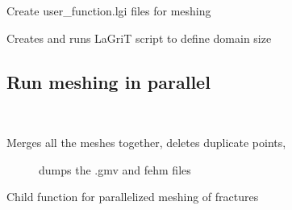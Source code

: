 \documentclass[letterpaper,10pt,english]{sphinxmanual}
\begin{document}

\begin{fulllineitems}
\label{pydfnworks:pydfnworks.lagrit_scripts.create_user_functions}
Create user\_function.lgi files for meshing

\end{fulllineitems}


\begin{fulllineitems}
\label{pydfnworks:pydfnworks.lagrit_scripts.define_zones}
Creates and runs LaGriT script to define domain size

\end{fulllineitems}



\subsection{Run meshing in parallel}
\label{pydfnworks:run-meshing-in-parallel}\label{pydfnworks:module-pydfnworks.run_meshing}\label{pydfnworks:module-run_meshing.py}

\begin{fulllineitems}
\label{pydfnworks:pydfnworks.run_meshing.merge_the_meshes}~\begin{description}
\item[{Merges all the meshes together, deletes duplicate points, }] \leavevmode
dumps the .gmv and fehm files

\end{description}

\end{fulllineitems}


\begin{fulllineitems}
\label{pydfnworks:pydfnworks.run_meshing.mesh_fracture}
Child function for parallelized meshing of fractures

\end{fulllineitems}
\end{document}
